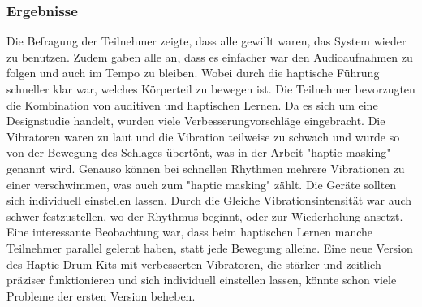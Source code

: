 \documentclass[ngerman,runningheads,a4paper]{llncs}
\begin{document}
\subsubsection{Ergebnisse}
Die Befragung der Teilnehmer zeigte, dass alle gewillt waren, das System wieder zu benutzen.
Zudem gaben alle an, dass es einfacher war den Audioaufnahmen zu folgen und auch im Tempo zu bleiben.
Wobei durch die haptische Führung schneller klar war, welches Körperteil zu bewegen ist.
Die Teilnehmer bevorzugten die Kombination von auditiven und haptischen Lernen.
Da es sich um eine Designstudie handelt, wurden viele Verbesserungvorschläge eingebracht.
Die Vibratoren waren zu laut und die Vibration teilweise zu schwach und wurde so von der Bewegung des Schlages übertönt, was in der Arbeit "haptic masking" genannt wird.
Genauso können bei schnellen Rhythmen mehrere Vibrationen zu einer verschwimmen, was auch zum "haptic masking" zählt.
Die Geräte sollten sich individuell einstellen lassen.
Durch die Gleiche Vibrationsintensität war auch schwer festzustellen, wo der Rhythmus beginnt, oder zur Wiederholung ansetzt.
Eine interessante Beobachtung war, dass beim haptischen Lernen manche Teilnehmer parallel gelernt haben, statt jede Bewegung alleine.
Eine neue Version des Haptic Drum Kits mit verbesserten Vibratoren, die stärker und zeitlich präziser funktionieren und sich individuell einstellen lassen, könnte schon viele Probleme der ersten Version beheben.
\end{document}
